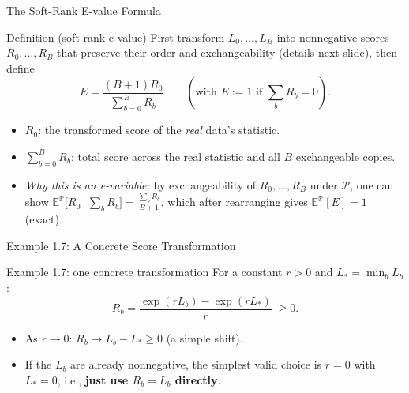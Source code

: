 \documentclass[aspectratio=169,10pt]{beamer}
\begin{document}
\begin{frame}{The Soft-Rank E-value Formula}

\begin{block}{Definition (soft-rank e-value)}
First transform $L_0,\dots,L_B$ into nonnegative scores
$R_0,\dots,R_B$ that preserve their order and exchangeability (details
next slide), then define
\[
  E = \frac{(B+1)R_0}{\sum_{b=0}^B R_b}
  \qquad (\text{with } E:=1 \text{ if } \textstyle\sum_b R_b = 0).
\]
\begin{itemize}
  \item $R_0$: the transformed score of the \emph{real} data's statistic.
  \item $\sum_{b=0}^B R_b$: total score across the real statistic and all
    $B$ exchangeable copies.
  \item \emph{Why this is an e-variable:} by exchangeability of
    $R_0,\dots,R_B$ under $\mathcal{P}$, one can show
    $\mathbb{E}^{\mathbb{P}}\!\big[R_0 \,\big|\, \textstyle\sum_b R_b\big] = \frac{\sum_b R_b}{B+1}$,
    which after rearranging gives $\mathbb{E}^{\mathbb{P}}[E]=1$ (exact).
\end{itemize}
\end{block}

\end{frame}

\begin{frame}{Example 1.7: A Concrete Score Transformation}

\begin{block}{Example 1.7: one concrete transformation}
For a constant $r>0$ and $L_*=\min_{b} L_b$:
\[
  R_b = \frac{\exp(rL_b) - \exp(rL_*)}{r} \;\ge 0.
\]
\begin{itemize}
  \item As $r\to 0$: $R_b \to L_b - L_*\ge 0$ (a simple shift).
  \item If the $L_b$ are already nonnegative, the simplest valid choice is
    $r=0$ with $L_*=0$, i.e., \textbf{just use $R_b=L_b$ directly}.
\end{itemize}
\end{block}

\end{frame}
\end{document}
